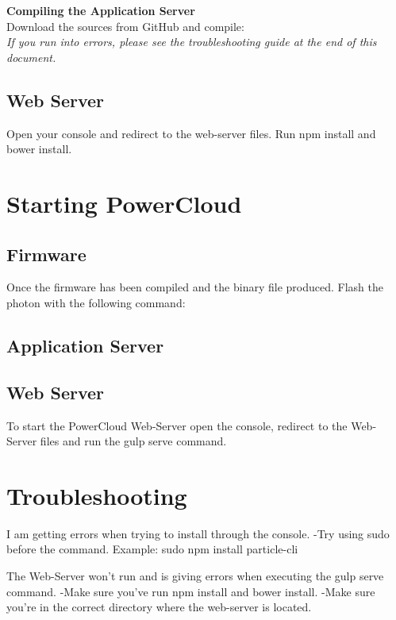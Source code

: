 \documentclass[a4paper,10pt]{article}
\begin{document}
			\textbf{Compiling the Application Server}\\
			Download the sources from GitHub and compile:\\
			
			\textit{If you run into errors, please see the troubleshooting guide at the end of this document.}
		\subsection{Web Server}
			Open your console and redirect to the web-server files. Run npm install and bower install.
		
	\section{Starting PowerCloud}
		\subsection{Firmware}
			Once the firmware has been compiled and the binary file produced. Flash the photon with the following command:
		\subsection{Application Server}
		
		\subsection{Web Server}
			To start the PowerCloud Web-Server open the console, redirect to the Web-Server files and run the gulp serve command.
		
	\section{Troubleshooting}
		I am getting errors when trying to install through the console.
		-Try using sudo before the command. Example: sudo npm install particle-cli
		
		The Web-Server won't run and is giving errors when executing the gulp serve command.
		-Make sure you've run npm install and bower install. 
		-Make sure you're in the correct directory where the web-server is located.
\end{document}
